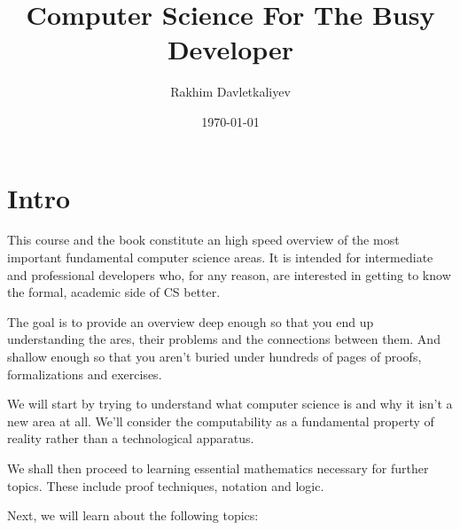 \documentclass[a4paper, sfsidenotes, justified, notitlepage]{tufte-book-lite}
\author{Rakhim Davletkaliyev}
\date{\today}
\title{Computer Science For The Busy Developer}
\begin{document}
\maketitle

\part{Intro}
\label{sec:orgd6f5f4f}

This course and the book constitute an high speed overview of the most important fundamental computer science areas. It is intended for intermediate and professional developers who, for any reason, are interested in getting to know the formal, academic side of CS better.

The goal is to provide an overview deep enough so that you end up understanding the ares, their problems and the connections between them. And shallow enough so that you aren't buried under hundreds of pages of proofs, formalizations and exercises.

We will start by trying to understand what computer science is and why it isn't a new area at all. We'll consider the computability as a fundamental property of reality rather than a technological apparatus.

We shall then proceed to learning essential mathematics necessary for further topics. These include proof techniques, notation and logic.

Next, we will learn about the following topics:

\end{document}
